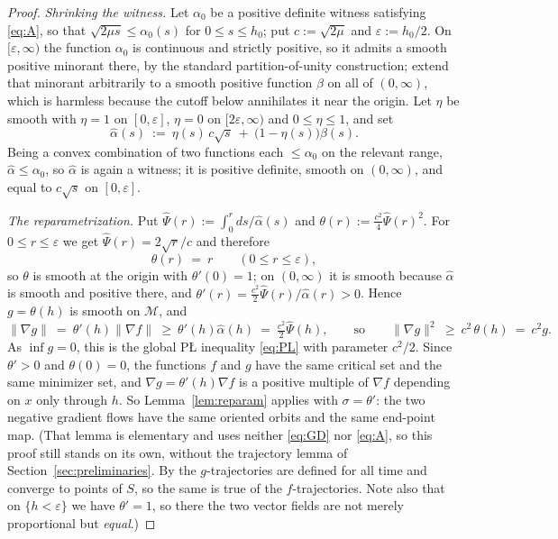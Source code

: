 \documentclass[11pt]{article}
\theoremstyle{plain}
\theoremstyle{definition}
\theoremstyle{remark}
\newcommand{\M}{\mathcal{M}}
\begin{document}
\begin{proof}
\emph{Shrinking the witness.} Let $\alpha_0$ be a positive definite witness
satisfying \eqref{eq:A}, so that $\sqrt{2\mu s}\le\alpha_0(s)$ for
$0\le s\le h_0$; put $c:=\sqrt{2\mu}$ and $\varepsilon := h_0/2$. On
$[\varepsilon,\infty)$ the function $\alpha_0$ is continuous and strictly
positive, so it admits a smooth positive minorant there, by the standard
partition-of-unity construction; extend that minorant arbitrarily to a smooth
positive function $\beta$ on all of $(0,\infty)$, which is harmless because the
cutoff below annihilates it near the origin. Let $\eta$ be smooth with $\eta=1$ on
$[0,\varepsilon]$, $\eta=0$ on $[2\varepsilon,\infty)$ and $0\le\eta\le1$, and set
\[
  \hat\alpha(s) \ :=\ \eta(s)\,c\sqrt{s} \ +\ \bigl(1-\eta(s)\bigr)\beta(s) .
\]
Being a convex combination of two functions each $\le\alpha_0$ on the relevant
range, $\hat\alpha\le\alpha_0$, so $\hat\alpha$ is again a witness; it is positive
definite, smooth on $(0,\infty)$, and equal to $c\sqrt s$ on $[0,\varepsilon]$.

\emph{The reparametrization.} Put
$\hat\Psi(r) := \int_0^r ds/\hat\alpha(s)$ and
$\theta(r) := \tfrac{c^2}{4}\hat\Psi(r)^2$. For $0\le r\le\varepsilon$ we get
$\hat\Psi(r)=2\sqrt r/c$ and therefore
\[
  \theta(r) \ =\ r \qquad (0\le r\le\varepsilon) ,
\]
so $\theta$ is smooth at the origin with $\theta'(0)=1$; on $(0,\infty)$ it is
smooth because $\hat\alpha$ is smooth and positive there, and
$\theta'(r) = \tfrac{c^2}{2}\hat\Psi(r)/\hat\alpha(r)>0$. Hence $g=\theta(h)$ is
smooth on $\M$, and
\[
  \|\nabla g\| \ =\ \theta'(h)\|\nabla f\| \ \ge\ \theta'(h)\hat\alpha(h)
  \ =\ \tfrac{c^2}{2}\hat\Psi(h) ,
  \qquad\text{so}\qquad
  \|\nabla g\|^2 \ \ge\ c^2\,\theta(h) \ =\ c^2 g .
\]
As $\inf g = 0$, this is the global P\L{} inequality \eqref{eq:PL} with parameter
$c^2/2$. Since $\theta'>0$ and $\theta(0)=0$, the functions $f$ and $g$ have the
same critical set and the same minimizer set, and $\nabla g = \theta'(h)\nabla f$
is a positive multiple of $\nabla f$ depending on $x$ only through $h$. So
Lemma~\ref{lem:reparam} applies with $\sigma=\theta'$: the two negative gradient
flows have the same oriented orbits and the same end-point map. (That lemma is
elementary and uses neither \eqref{eq:GD} nor \eqref{eq:A}, so this proof still
stands on its own, without the trajectory lemma of
Section~\ref{sec:preliminaries}. By \cite{BCR2026} the $g$-trajectories are
defined for all time and converge to points of $S$, so the same is true of the
$f$-trajectories. Note also that on $\{h<\varepsilon\}$ we have $\theta'=1$, so
there the two vector fields are not merely proportional but \emph{equal}.)


\end{proof}
\end{document}
